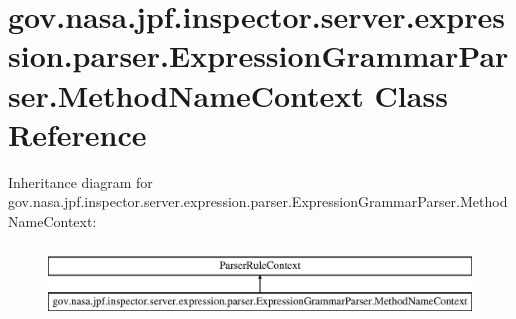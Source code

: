 \hypertarget{classgov_1_1nasa_1_1jpf_1_1inspector_1_1server_1_1expression_1_1parser_1_1_expression_grammar_parser_1_1_method_name_context}{}\section{gov.\+nasa.\+jpf.\+inspector.\+server.\+expression.\+parser.\+Expression\+Grammar\+Parser.\+Method\+Name\+Context Class Reference}
\label{classgov_1_1nasa_1_1jpf_1_1inspector_1_1server_1_1expression_1_1parser_1_1_expression_grammar_parser_1_1_method_name_context}
Inheritance diagram for gov.\+nasa.\+jpf.\+inspector.\+server.\+expression.\+parser.\+Expression\+Grammar\+Parser.\+Method\+Name\+Context\+:\begin{figure}[H]
\begin{center}
\leavevmode
\includegraphics[height=1.971831cm]{classgov_1_1nasa_1_1jpf_1_1inspector_1_1server_1_1expression_1_1parser_1_1_expression_grammar_parser_1_1_method_name_context}
\end{center}
\end{figure}
